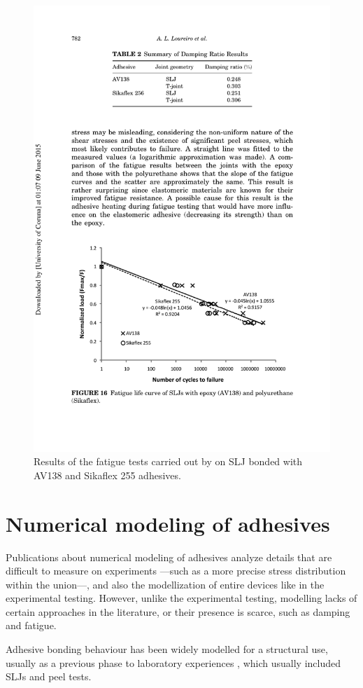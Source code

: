 \documentclass[
documentsize = a4, %
font = cmr, %
typesize = 11, %
printmode = true,
onehalfspacing = true,
language = en, %
titlepage = udciccp, %
degree = pt, %
dedication = true,
acknowledgements = true,
abstract-en = true,
abstract-es = false,
abstract-ga = false,
epigraphs = true,
toc = true,
lof = true,
lot = true,
frontmatterintoc = false,
notation = false,
minimal = false,
]{UDCthesis}
\begin{document}
\begin{figure}
	\centering
	\includegraphics[width=0.7\linewidth]{IMG_CUTRES/Loureiro_fatigue}
	\caption{Results of the fatigue tests carried out by \citet{Loureiro2010} on \gls{SLJ} bonded with AV138 and Sikaflex 255 adhesives.}
	\label{fig:Loureiro_fatigue}
\end{figure}

\section{Numerical modeling of adhesives}

Publications about numerical modeling of adhesives analyze details that are difficult to measure on experiments ---such as a more precise stress distribution within the union---, and also the modellization of entire devices like in the experimental testing. However, unlike the experimental testing, modelling lacks of certain approaches in the literature, or their presence is scarce, such as damping and fatigue.

Adhesive bonding behaviour has been widely modelled for a structural use, usually as a previous phase to laboratory experiences \citep{Sato2000, Grant2009, Loureiro2010, Yang2012, Sadowski2014}, which usually included \glspl{SLJ} and peel tests.
\end{document}
